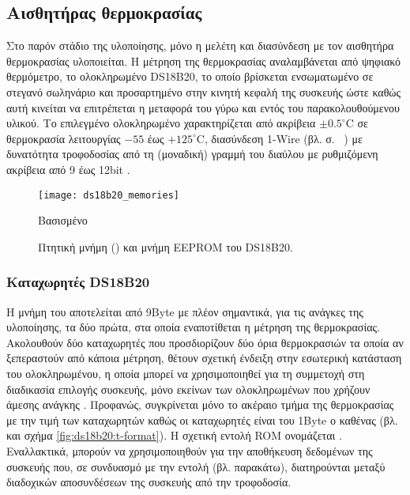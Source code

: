 \subsection{Αισθητήρας θερμοκρασίας}
\label{subsec:ds18b20}

Στο παρόν στάδιο της υλοποίησης, μόνο η μελέτη και διασύνδεση με τον αισθητήρα
θερμοκρασίας υλοποιείται.
Η μέτρηση της θερμοκρασίας αναλαμβάνεται από ψηφιακό θερμόμετρο, το ολοκληρωμένο
DS18B20, το οποίο βρίσκεται ενσωματωμένο σε στεγανό σωληνάριο και προσαρτημένο
στην κινητή κεφαλή της συσκευής ώστε καθώς αυτή κινείται να επιτρέπεται η
μεταφορά του γύρω και εντός του παρακολουθούμενου υλικού. Το επιλεγμένο
ολοκληρωμένο χαρακτηρίζεται από ακρίβεια $\pm0.5^\circ$C σε θερμοκρασία
λειτουργίας $-55$ έως $+125^\circ$C, διασύνδεση 1-Wire (βλ. σ.~%
\pageref{subsec:1-wire}) με δυνατότητα τροφοδοσίας από τη (μοναδική) γραμμή του
διαύλου με ρυθμιζόμενη ακρίβεια από 9 έως 12bit \parencite[1]{ds18b20}.

\begin{figure}
    \caption{Πτητική μνήμη () και μνήμη EEPROM του DS18B20.
    \label{fig:ds18b20:memories}}
    \begin{center}
    \texttt{[image: ds18b20\_memories]}
    \end{center}
    Βασισμένο 
\end{figure}


\subsubsection{Καταχωρητές DS18B20}
\label{ssubsec:ds18b20:registers}

Η μνήμη του αποτελείται από 9Byte με πλέον σημαντικά, για τις ανάγκες της
υλοποίησης, τα δύο πρώτα, στα οποία εναποτίθεται η μέτρηση της θερμοκρασίας.
Ακολουθούν δύο καταχωρητές που προσδιορίζουν δύο όρια θερμοκρασιών τα οποία αν
ξεπεραστούν από κάποια μέτρηση, θέτουν σχετική ένδειξη στην εσωτερική κατάσταση
του ολοκληρωμένου, η οποία μπορεί να χρησιμοποιηθεί για τη συμμετοχή στη
διαδικασία επιλογής  συσκευής, μόνο εκείνων των ολοκληρωμένων που
χρήζουν άμεσης ανάγκης \parencite[4--5]{ds18b20}. Προφανώς, συγκρίνεται μόνο το
ακέραιο τμήμα της θερμοκρασίας με την τιμή των καταχωρητών καθώς οι καταχωρητές
είναι του 1Byte ο καθένας (βλ. και σχήμα \ref{fig:ds18b20:t-format}). Η σχετική
εντολή ROM ονομάζεται . Εναλλακτικά, μπορούν να χρησιμοποιηθούν
για την αποθήκευση δεδομένων της συσκευής που, σε συνδυασμό με την εντολή
 (βλ. παρακάτω), διατηρούνται μεταξύ διαδοχικών αποσυνδέσεων
της συσκευής από την τροφοδοσία.

